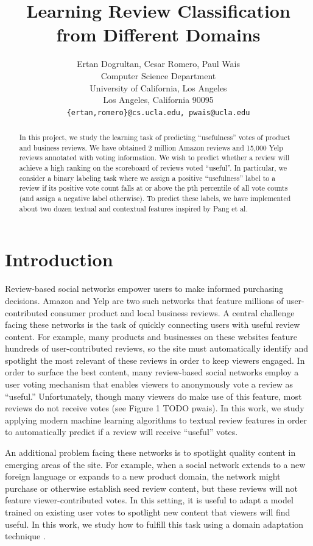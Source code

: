 \documentclass[letterpaper]{article}
\title{Learning Review Classification from Different Domains}
\author{Ertan Dogrultan, Cesar Romero, Paul Wais\\
Computer Science Department \\
University of California, Los Angeles\\
Los Angeles, California 90095\\
\texttt{\{ertan,romero\}@cs.ucla.edu, pwais@ucla.edu}}
\begin{document}
\maketitle
\begin{abstract}
  In this project, we study the learning task of predicting
  ``usefulness'' votes of product and business reviews.  We have
  obtained 2 million Amazon reviews and 15,000 Yelp reviews annotated
  with voting information.  We wish to predict whether a review will
  achieve a high ranking on the scoreboard of reviews voted
  ``useful''.  In particular, we consider a binary labeling task where
  we assign a positive ``usefulness'' label to a review if its
  positive vote count falls at or above the pth percentile of all vote
  counts (and assign a negative label otherwise).  To predict these
  labels, we have implemented about two dozen textual and contextual
  features inspired by Pang et al. \cite{PangSentimentClassification}
\end{abstract}

\section{Introduction}
\label{sec:introduction}

Review-based social networks empower users to make informed purchasing
decisions.  Amazon and Yelp are two such networks that feature
millions of user-contributed consumer product and local business
reviews.  A central challenge facing these networks is the task of
quickly connecting users with useful review content.  For example,
many products and businesses on these websites feature hundreds of
user-contributed reviews, so the site must automatically identify and
spotlight the most relevant of these reviews in order to keep viewers
engaged.  In order to surface the best content, many review-based
social networks employ a user voting mechanism that enables viewers to
anonymously vote a review as ``useful.''  Unfortunately, though many
viewers do make use of this feature, most reviews do not receive votes
(see Figure 1 TODO pwais).  In this work, we study applying modern
machine learning algorithms to textual review features in order to
automatically predict if a review will receive ``useful'' votes.

An additional problem facing these networks is to spotlight quality
content in emerging areas of the site.  For example, when a social
network extends to a new foreign language or expands to a new product
domain, the network might purchase or otherwise establish seed review
content, but these reviews will not feature viewer-contributed votes.
In this setting, it is useful to adapt a model trained on existing
user votes to spotlight new content that viewers will find useful.  In
this work, we study how to fulfill this task using a domain adaptation
technique \cite{JennLearnDiffDomains}.
\end{document}
